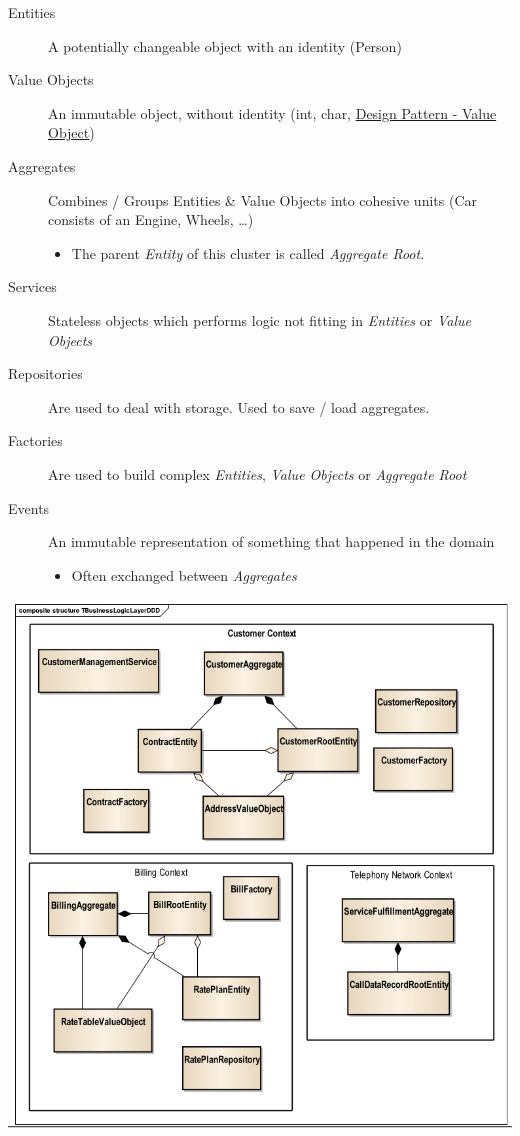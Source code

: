 \documentclass[11pt,twoside,landscape]{article}
\begin{document}
\begin{multicols}{3}
\begin{description}
\item[{Entities}] A potentially changeable object with an identity (Person)
\item[{Value Objects}] An immutable object, without identity (int, char, \href{../../../roam/20230105183150-design_pattern_value_object.org}{Design Pattern - Value Object})
\item[{Aggregates}] Combines / Groups Entities \& Value Objects into cohesive units (Car consists of an Engine, Wheels, \ldots{})
\begin{itemize}
\item The parent \emph{Entity} of this cluster is called \emph{Aggregate Root}.
\end{itemize}
\item[{Services}] Stateless objects which performs logic not fitting in \emph{Entities} or \emph{Value Objects}
\item[{Repositories}] Are used to deal with storage. Used to save / load aggregates.
\item[{Factories}] Are used to build complex \emph{Entities}, \emph{Value Objects} or \emph{Aggregate Root}
\item[{Events}] An immutable representation of something that happened in the domain
\begin{itemize}
\item Often exchanged between \emph{Aggregates}
\end{itemize}
\end{description}


{
\begin{center}
\includegraphics[width=.9\linewidth]{img/tactic_ddd_example.png}
\end{center}
\label{fig:tactic-ddd-example}
}


\end{multicols}
\end{document}
